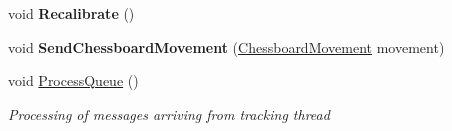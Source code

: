 \begin{DoxyCompactItemize}
void {\bfseries Recalibrate} ()
\item 
\mbox{\label{class_chess_tracking_1_1_controlling_elements_1_1_tracking_manager_ac8d46ee462cb136c41cdbba6863ac6f7}} 
void {\bfseries Send\+Chessboard\+Movement} (\mbox{\hyperlink{namespace_chess_tracking_1_1_multithreading_messages_1_1_to_processing_af48751428f7a12d314dbbac688726bac}{Chessboard\+Movement}} movement)
\item 
void \mbox{\hyperlink{class_chess_tracking_1_1_controlling_elements_1_1_tracking_manager_a25d9c67ca29f33db16fe5b319b1fda40}{Process\+Queue}} ()
\begin{DoxyCompactList}\small\item\em Processing of messages arriving from tracking thread \end{DoxyCompactList}\end{DoxyCompactItemize}
